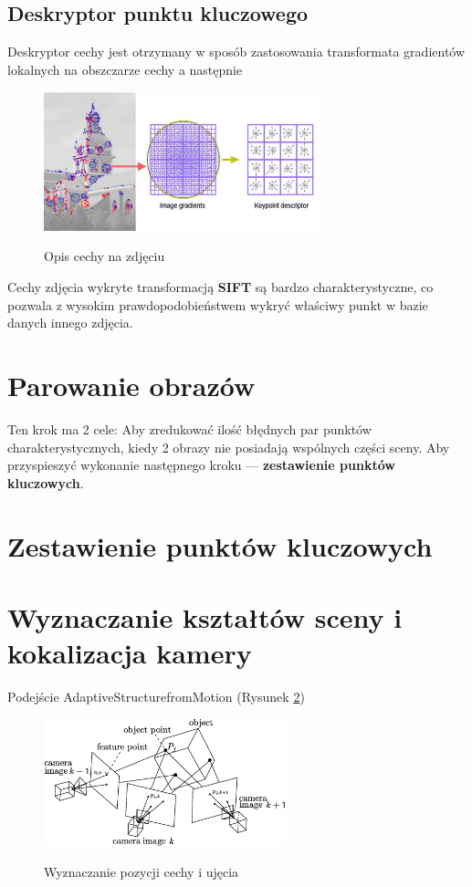 \subsection{Deskryptor punktu kluczowego}
      Deskryptor cechy jest otrzymany w sposób zastosowania transformata gradientów lokalnych na obszczarze cechy a następnie
      \begin{figure}[h]
         \centering
         \includegraphics[width=8cm]{SIFT_vectors.jpg}
         \label {fig:SIFT_desc}
         \caption{Opis cechy na zdjęciu}
      \end{figure}

Cechy zdjęcia wykryte transformacją \textbf{SIFT} są bardzo charakterystyczne, co pozwala z wysokim prawdopodobieństwem wykryć właściwy punkt w bazie danych innego zdjęcia.

\section{Parowanie obrazów}
Ten krok ma 2 cele:
Aby zredukować ilość błędnych par punktów charakterystycznych, kiedy 2 obrazy nie posiadają wspólnych części sceny.
Aby przyspieszyć wykonanie następnego kroku --- \textbf{zestawienie punktów kluczowych}.

\section{Zestawienie punktów kluczowych}

\section{Wyznaczanie kształtów sceny i kokalizacja kamery}
Podejście AdaptiveStructurefromMotion (Rysunek \ref{fig:SfM})

\begin{figure}[h]
   \centering
   \includegraphics[width=7cm]{SfM.png}
   \label {fig:SfM}
   \caption{Wyznaczanie pozycji cechy i ujęcia}
\end{figure}
